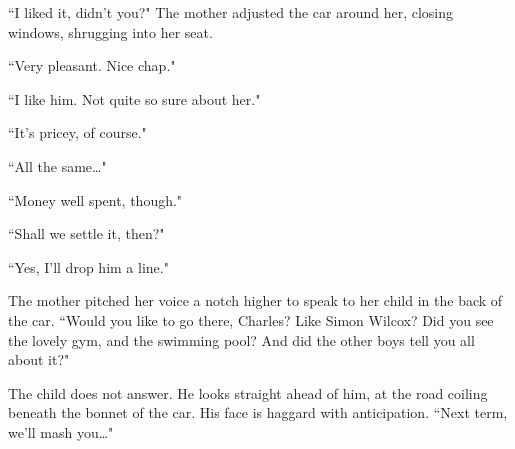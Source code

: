 \documentclass[10pt,a4paper]{article}
\newcommand{\qm}[1]{``#1"}
\begin{document}
\qm{I liked it, didn't you?} The mother adjusted the car around her, closing windows, shrugging into her seat.

\qm{Very pleasant. Nice chap.}

\qm{I like him. Not quite so sure about her.}

\qm{It's pricey, of course.}

\qm{All the same\ldots}

\qm{Money well spent, though.}

\qm{Shall we settle it, then?}

\qm{Yes, I'll drop him a line.}

The mother pitched her voice a notch higher to speak to her child in the back of the car. \qm{Would you like to go there, Charles? Like Simon Wilcox? Did you see the lovely gym, and the swimming pool? And did the other boys tell you all about it?}

The child does not answer. He looks straight ahead of him, at the road coiling beneath the bonnet of the car. His face is haggard with anticipation. \qm{Next term, we'll mash you\ldots}
\end{document}
